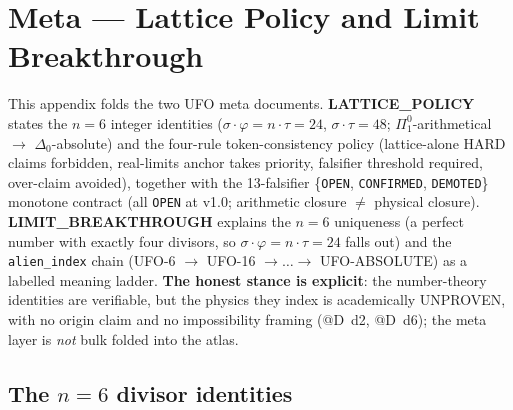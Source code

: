 \section{Meta --- Lattice Policy and Limit Breakthrough}
\label{app:meta}

This appendix folds the two UFO meta documents.
\textbf{LATTICE\_POLICY} states the $n\!=\!6$ integer identities
($\sigma\!\cdot\!\varphi=n\!\cdot\!\tau=24$,
$\sigma\!\cdot\!\tau=48$; $\Pi^0_1$-arithmetical $\to$
$\Delta_0$-absolute) and the four-rule token-consistency policy
(lattice-alone HARD claims forbidden, real-limits anchor takes priority,
falsifier threshold required, over-claim avoided), together with the
13-falsifier \{\texttt{OPEN}, \texttt{CONFIRMED}, \texttt{DEMOTED}\}
monotone contract (all \texttt{OPEN} at v1.0; arithmetic closure
$\ne$ physical closure). \textbf{LIMIT\_BREAKTHROUGH} explains the
$n\!=\!6$ uniqueness (a perfect number with exactly four divisors, so
$\sigma\!\cdot\!\varphi=n\!\cdot\!\tau=24$ falls out) and the
\verb|alien_index| chain (UFO-6 $\to$ UFO-16 $\to\dots\to$
UFO-ABSOLUTE) as a labelled meaning ladder. \textbf{The honest stance is
explicit}: the number-theory identities are verifiable, but the physics
they index is academically UNPROVEN, with no origin claim and no
impossibility framing (@D~d2, @D~d6); the meta layer is \emph{not} bulk
folded into the atlas.

\subsection{The $n=6$ divisor identities}
\label{app:meta-lattice}


